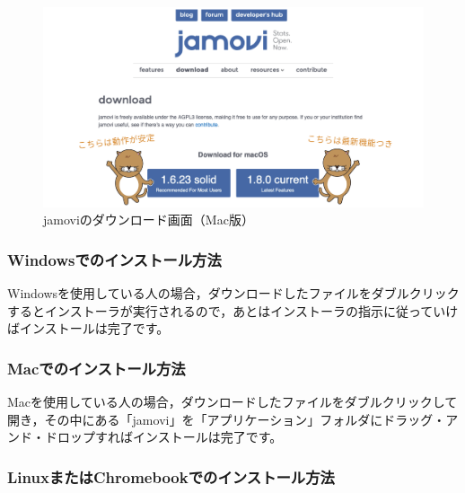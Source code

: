 \documentclass[
  12pt,
  a5jpaper,
  lualatex, ja=standard]{bxjsbook}
\begin{document}
\begin{figure}[!ht]

{\centering \includegraphics[width=1\linewidth]{images/intro/jamovi-download} 

}

\caption{jamoviのダウンロード画面（Mac版）}\label{fig:jamovi-download}
\end{figure}

\hypertarget{sub:intro-install-win}{%
\subsubsection*{Windowsでのインストール方法}\label{sub:intro-install-win}}

Windowsを使用している人の場合，ダウンロードしたファイルをダブルクリックするとインストーラが実行されるので，あとはインストーラの指示に従っていけばインストールは完了です。

\hypertarget{sub:intro-install-mac}{%
\subsubsection*{Macでのインストール方法}\label{sub:intro-install-mac}}

Macを使用している人の場合，ダウンロードしたファイルをダブルクリックして開き，その中にある「jamovi」を「アプリケーション」フォルダにドラッグ・アンド・ドロップすればインストールは完了です。

\hypertarget{sub:intro-install-other}{%
\subsubsection*{LinuxまたはChromebookでのインストール方法}\label{sub:intro-install-other}}
\end{document}
